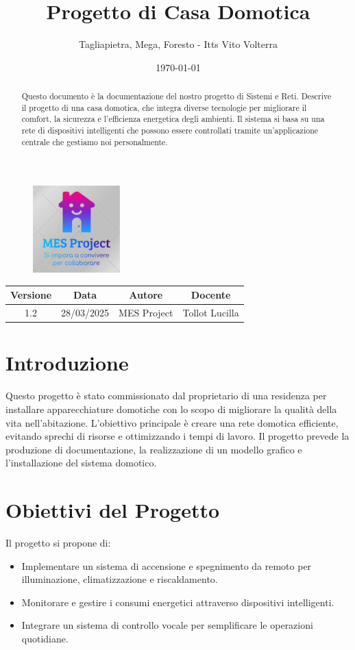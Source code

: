 \documentclass[a4paper,12pt]{article}
\title{Progetto di Casa Domotica}
\author{Tagliapietra, Mega, Foresto - Itts Vito Volterra \\}
\date{\today}
\begin{document}
\maketitle
\begin{figure}[h!]
    \vspace{-0.8cm}
    \centering
    \includegraphics[width=0.3\textwidth]{logoProgetto.png} 
    \vspace{-0.5cm}
\end{figure}
\begin{abstract}
Questo documento è la documentazione del nostro progetto di Sistemi e Reti. Descrive il progetto di una casa domotica, che integra diverse tecnologie per migliorare il comfort, la sicurezza e l'efficienza energetica degli ambienti. Il sistema si basa su una rete di dispositivi intelligenti che possono essere controllati tramite un'applicazione centrale che gestiamo noi personalmente.
\end{abstract}
\begin{center}
    \begin{tabular}{|c|c|c|c|}
       \hline 
       Versione & Data & Autore & Docente \\
       \hline 
       1.2 & 28/03/2025 & MES Project & Tollot Lucilla \\
    \end{tabular}
\end{center}
\tableofcontents
\section{Introduzione}
Questo progetto è stato commissionato dal proprietario di una residenza per installare apparecchiature domotiche con lo scopo di migliorare la qualità della vita nell’abitazione. L’obiettivo principale è creare una rete domotica efficiente, evitando sprechi di risorse e ottimizzando i tempi di lavoro.
Il progetto prevede la produzione di documentazione, la realizzazione di un modello grafico e l’installazione del sistema domotico.
\section{Obiettivi del Progetto}
Il progetto si propone di:
\begin{itemize}
    \item Implementare un sistema di accensione e spegnimento da remoto per illuminazione,          
    climatizzazione e riscaldamento.
    \item Monitorare e gestire i consumi energetici attraverso dispositivi intelligenti.
    \item Integrare un sistema di controllo vocale per semplificare le operazioni quotidiane.
\end{itemize}
\end{document}
